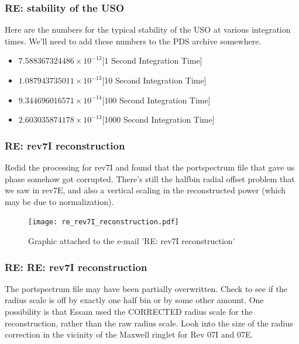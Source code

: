 \documentclass[crop=false,class=book]{standalone}
\begin{document}
\subsubsection{\footnotesize RE: stability of the USO}
Here are the numbers for the typical stability of the USO at various integration times. We'll need to add these numbers to the PDS archive somewhere.
\begin{itemize}
    \item $7.588367324486\times 10^{-13}$\hfill [1 Second Integration Time]
    \item $1.087943735011\times 10^{-13}$\hfill [10 Second Integration Time]
    \item $9.344696016571\times 10^{-14}$\hfill [100 Second Integration Time]
    \item $2.603035874178\times 10^{-13}$\hfill [1000 Second Integration Time]
\end{itemize}
\subsubsection{\footnotesize RE: rev7I reconstruction}
Redid the processing for rev7I and found that the portspectrum file that gave us phase somehow got corrupted. There’s still the halfbin radial offset problem that we saw in rev7E, and also a vertical scaling in the reconstructed power (which may be due to normalization).
\begin{figure}[H]
    \centering
    \texttt{[image: re\_rev7I\_reconstruction.pdf]}
    \caption{Graphic attached to the e-mail '\textnormal{RE: rev7I reconstruction}'}
\end{figure}
\subsubsection{\footnotesize RE: RE: rev7I reconstruction}
The portspectrum file may have been partially overwritten. Check to see if the radius scale is off by exactly one half bin or by some other amount. One possibility is that Essam used the CORRECTED radius scale for the reconstruction, rather than the raw radius scale. Look into the size of the radius correction in the vicinity of the Maxwell ringlet for Rev 07I and 07E.
\end{document}
